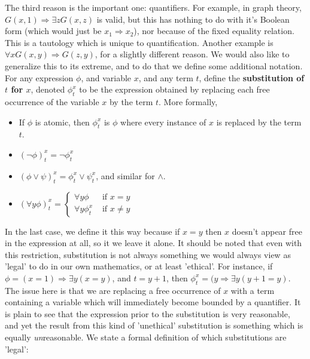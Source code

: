 \documentclass{article}
\theoremstyle{definition}
\theoremstyle{plain}
\theoremstyle{theorem}
\begin{document}
The third reason is the important one: quantifiers. For example, in graph theory, $G(x,1) \Rightarrow \exists z G(x,z)$ is valid, but this has nothing to do with it's Boolean form (which would just be $x_1 \Rightarrow x_2$), nor because of the fixed equality relation. This is a tautology which is unique to quantification. Another example is $\forall x G(x,y) \Rightarrow G(z,y)$, for a slightly different reason. We would also like to generalize this to its extreme, and to do that we define some additional notation. For any expression $\phi$, and variable $x$, and any term $t$, define the \textbf{substitution of $t$ for $x$}, denoted $\phi_t^x$ to be the expression obtained by replacing each free occurrence of the variable $x$ by the term $t$. More formally,
\begin{itemize}
    \item If $\phi$ is atomic, then $\phi_t^x$ is $\phi$ where every instance of $x$ is replaced by the term $t$.
    \item $(\neg \phi)_t^x = \neg \phi_t^x$
    \item $(\phi \vee \psi)_t^x = \phi_t^x \vee \psi_t^x$, and similar for $\wedge$.
    \item $(\forall y \phi)_t^x = \begin{cases}
                                     \forall y \phi & \textrm{ if $x = y$} \\
                                     \forall y \phi_t^x & \textrm{ if $x \neq y$}
                                  \end{cases}$
\end{itemize}
In the last case, we define it this way because if $x = y$ then $x$ doesn't appear free in the expression at all, so it we leave it alone. It should be noted that even with this restriction, substitution is not always something we would always view as 'legal' to do in our own mathematics, or at least 'ethical'. For instance, if $\phi = (x=1) \Rightarrow \exists y (x=y)$, and $t = y+1$, then $\phi_t^x = (y \Rightarrow \exists y (y+1 = y)$. The issue here is that we are replacing a free occurrence of $x$ with a term containing a variable which will immediately become bounded by a quantifier. It is plain to see that the expression prior to the substitution is very reasonable, and yet the result from this kind of 'unethical' substitution is something which is equally \textit{un}reasonable. We state a formal definition of which substitutions are 'legal':
\end{document}
